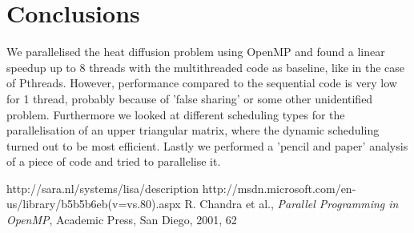 \documentclass[11pt,a4paper,onecolumn]{article}
\begin{document}
\section{Conclusions}
We parallelised the heat diffusion problem using OpenMP and found a linear speedup up to 8 threads with the multithreaded code as baseline, like in the case of Pthreads. However, performance compared to the sequential code is very low for 1 thread, probably because of 'false sharing' or some other unidentified problem. Furthermore we looked at different scheduling types for the parallelisation of an upper triangular matrix, where the dynamic scheduling turned out to be most efficient. Lastly we performed a 'pencil and paper' analysis of a piece of code and tried to parallelise it. 

\begin{thebibliography}{7}
  http://sara.nl/systems/lisa/description
  http://msdn.microsoft.com/en-us/library/b5b5b6eb(v=vs.80).aspx
  R. Chandra et al., \emph{Parallel Programming in OpenMP}, Academic Press, San Diego, 2001, 62
\end{thebibliography}
\end{document}
